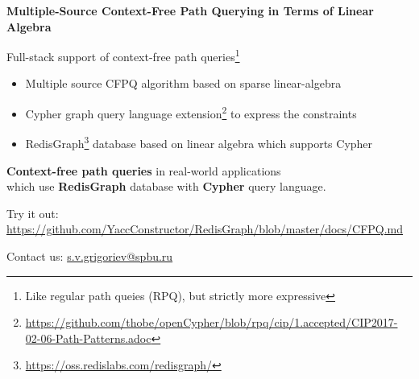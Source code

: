 \documentclass{article}
\begin{document}
\begin{center}
\textbf {\LARGE Multiple-Source Context-Free Path Querying in Terms of Linear Algebra}
\end{center}

\vfill

{\Large
\begin{center}
Full-stack support of context-free path queries\footnote{Like regular path queies (RPQ), but strictly more expressive}
\end{center}
} 

\vfill


{\large
\begin{itemize}
	\item Multiple source CFPQ algorithm based on sparse linear-algebra
	\item Cypher graph query language extension\footnote{\href{https://github.com/thobe/openCypher/blob/rpq/cip/1.accepted/CIP2017-02-06-Path-Patterns.adoc}{https://github.com/thobe/openCypher/blob/rpq/cip/1.accepted/CIP2017-02-06-Path-Patterns.adoc}} to express the constraints
    \item RedisGraph\footnote{\href{https://oss.redislabs.com/redisgraph/}{https://oss.redislabs.com/redisgraph/}} database based on linear algebra which supports Cypher
\end{itemize} 

\vfill

\begin{center}
\textbf{Context-free path queries} in real-world applications \\ which use \textbf{RedisGraph} database with \textbf{Cypher} query language.
\end{center}
}

\vspace{0.5cm} 


{ 




 {\small Try it out: \href{https://github.com/YaccConstructor/RedisGraph/blob/master/docs/CFPQ.md}{https://github.com/YaccConstructor/RedisGraph/blob/master/docs/CFPQ.md}

 Contact us: \href{mailto:s.v.grigoriev@spbu.ru}{s.v.grigoriev@spbu.ru}}
 }
\end{document}
